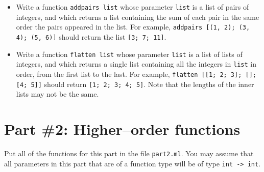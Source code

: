 \documentclass[11pt]{article}
\begin{document}
\begin{itemize}
      \item Write a function \texttt{addpairs list} whose parameter
            \texttt{list} is a list of pairs of integers, and which returns
            a list containing the sum of each pair in the same order the
            pairs appeared in the list.  For example, \texttt{addpairs [(1,
            2); (3, 4); (5, 6)]} should return the list \texttt{[3; 7;
            11]}.

      \item Write a function \texttt{flatten list} whose parameter
            \texttt{list} is a list of lists of integers, and which returns
            a single list containing all the integers in \texttt{list} in
            order, from the first list to the last.  For example,
            \texttt{flatten [[1; 2; 3]; []; [4; 5]]} should return
            \texttt{[1; 2; 3; 4; 5]}.  Note that the lengths of the inner
            lists may not be the same.

    \end{itemize}

    \vspace{-3.5mm}

  \section{Part \#2: Higher--order functions}

    Put all of the functions for this part in the file \texttt{part2.ml}.  You
  may assume that all parameters in this part that are of a function type
  will be of type \texttt{int -> int}.

    \vspace{-2.5mm}
\end{document}
